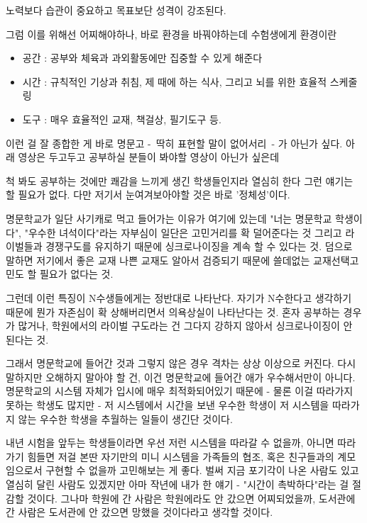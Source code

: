 노력보다 습관이 중요하고
목표보단 성격이 강조된다.
\vspace{5mm}

그럼 이를 위해선 어찌해야하나, 바로 환경을 바꿔야하는데
수험생에게 환경이란
\vspace{5mm}

\begin{itemize}
    \item 공간 : 공부와 체육과 과외활동에만 집중할 수 있게 해준다
    \item 시간 : 규칙적인 기상과 취침, 제 때에 하는 식사, 그리고 뇌를 위한 효율적 스케줄링
    \item 도구 : 매우 효율적인 교재, 책걸상, 필기도구 등.
\end{itemize}
\vspace{5mm}

이런 걸 잘 종합한 게 바로 명문고 - 딱히 표현할 말이 없어서리 - 가 아닌가 싶다.
아래 영상은 두고두고 공부하실 분들이 봐야할 영상이 아닌가 싶은데
\vspace{5mm}

척 봐도 공부하는 것에만 쾌감을 느끼게 생긴 학생들인지라 열심히 한다 그런 얘기는 할 필요가 없다.
다만 저기서 눈여겨보아야할 것은 바로 '정체성'이다.
\vspace{5mm}

명문학교가 일단 사기캐로 먹고 들어가는 이유가 여기에 있는데
"너는 명문학교 학생이다", "우수한 녀석이다"라는 자부심이 일단은 고민거리를 확 덜어준다는 것
그리고 라이벌들과 경쟁구도를 유지하기 때문에 싱크로나이징을 계속 할 수 있다는 것.
덤으로 말하면 저기에서 좋은 교재 나쁜 교재도 알아서 검증되기 때문에 쓸데없는 교재선택고민도 할 필요가 없다는 것.
\vspace{5mm}

그런데 이런 특징이 N수생들에게는 정반대로 나타난다.
자기가 N수한다고 생각하기 때문에 뭔가 자존심이 확 상해버리면서 의욕상실이 나타난다는 것.
혼자 공부하는 경우가 많거나, 학원에서의 라이벌 구도라는 건 그다지 강하지 않아서 싱크로나이징이 안 된다는 것.
\vspace{5mm}

그래서 명문학교에 들어간 것과 그렇지 않은 경우 격차는 상상 이상으로 커진다.
다시 말하지만 오해하지 말아야 할 건, 이건 명문학교에 들어간 애가 우수해서만이 아니다.
명문학교의 시스템 자체가 입시에 매우 최적화되어있기 때문에 - 물론 이걸 따라가지 못하는 학생도 많지만 -
저 시스템에서 시간을 보낸 우수한 학생이 저 시스템을 따라가지 않는 우수한 학생을 추월하는 일들이 생긴단 것이다.
\vspace{5mm}

내년 시험을 앞두는 학생들이라면 우선 저런 시스템을 따라갈 수 없을까, 아니면 따라가기 힘들면
저걸 본딴 자기만의 미니 시스템을 가족들의 협조, 혹은 친구들과의 계모임으로서 구현할 수 없을까 고민해보는 게 좋다.
벌써 지금 포기각이 나온 사람도 있고 열심히 달린 사람도 있겠지만 아마 작년에 내가 한 얘기 - "시간이 촉박하다"라는 걸 절감할 것이다.
그나마 학원에 간 사람은 학원에라도 안 갔으면 어찌되었을까, 도서관에 간 사람은 도서관에 안 갔으면 망했을 것이다라고 생각할 것이다.
\vspace{5mm}

